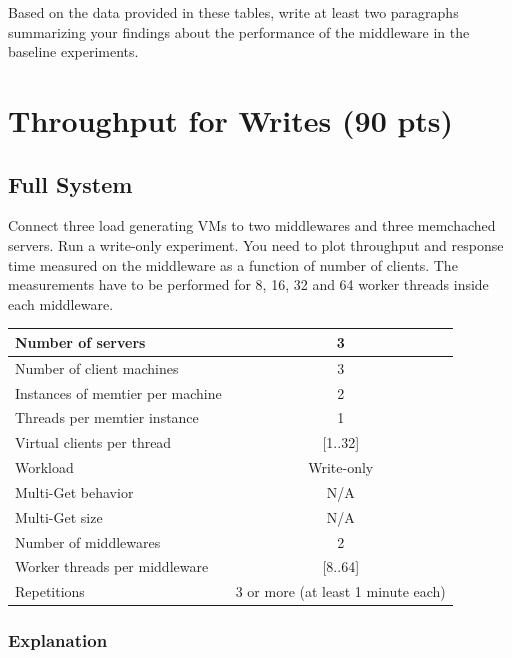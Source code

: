 \documentclass[11pt,a4paper]{article}
\begin{document}
Based on the data provided in these tables, write at least two paragraphs summarizing your findings about the performance of the middleware in the baseline experiments.

\section{Throughput for Writes (90 pts)}

\subsection{Full System}

Connect three load generating VMs to two middlewares and three memchached servers. Run a write-only experiment.
You need to plot throughput and response time measured on the middleware as a function of number of clients. The measurements have to be performed for 8, 16, 32 and 64 worker threads inside each middleware.

\begin{center}
	\scriptsize{
		\begin{tabular}{|l|c|}
			\hline Number of servers                & 3          \\
			\hline Number of client machines        & 3          \\
			\hline Instances of memtier per machine & 2          \\
			\hline Threads per memtier instance     & 1          \\
			\hline Virtual clients per thread       & [1..32]    \\
			\hline Workload                         & Write-only \\
			\hline Multi-Get behavior               & N/A        \\
			\hline Multi-Get size                   & N/A        \\
			\hline Number of middlewares            & 2          \\
			\hline Worker threads per middleware    & [8..64]    \\
			\hline Repetitions                      & 3 or more (at least 1 minute each)  \\
			\hline
		\end{tabular}
	}
\end{center}

\subsubsection{Explanation}
\end{document}
